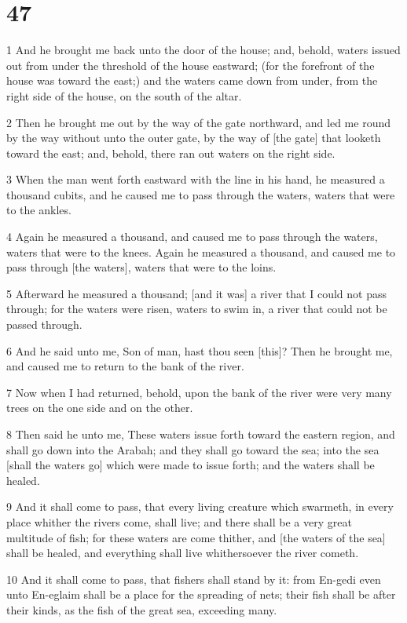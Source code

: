 \chapter{47}

\par 1 And he brought me back unto the door of the house; and, behold, waters issued out from under the threshold of the house eastward; (for the forefront of the house was toward the east;) and the waters came down from under, from the right side of the house, on the south of the altar.
\par 2 Then he brought me out by the way of the gate northward, and led me round by the way without unto the outer gate, by the way of [the gate] that looketh toward the east; and, behold, there ran out waters on the right side.
\par 3 When the man went forth eastward with the line in his hand, he measured a thousand cubits, and he caused me to pass through the waters, waters that were to the ankles.
\par 4 Again he measured a thousand, and caused me to pass through the waters, waters that were to the knees. Again he measured a thousand, and caused me to pass through [the waters], waters that were to the loins.
\par 5 Afterward he measured a thousand; [and it was] a river that I could not pass through; for the waters were risen, waters to swim in, a river that could not be passed through.
\par 6 And he said unto me, Son of man, hast thou seen [this]? Then he brought me, and caused me to return to the bank of the river.
\par 7 Now when I had returned, behold, upon the bank of the river were very many trees on the one side and on the other.
\par 8 Then said he unto me, These waters issue forth toward the eastern region, and shall go down into the Arabah; and they shall go toward the sea; into the sea [shall the waters go] which were made to issue forth; and the waters shall be healed.
\par 9 And it shall come to pass, that every living creature which swarmeth, in every place whither the rivers come, shall live; and there shall be a very great multitude of fish; for these waters are come thither, and [the waters of the sea] shall be healed, and everything shall live whithersoever the river cometh.
\par 10 And it shall come to pass, that fishers shall stand by it: from En-gedi even unto En-eglaim shall be a place for the spreading of nets; their fish shall be after their kinds, as the fish of the great sea, exceeding many.
